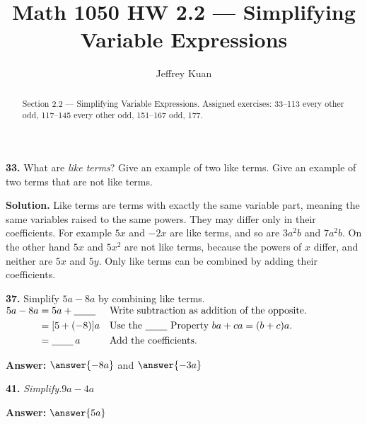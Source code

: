 \documentclass{ximera}
\author{Jeffrey Kuan}
\title{Math 1050 HW 2.2 --- Simplifying Variable Expressions}
\begin{document}
\begin{abstract}
    Section 2.2 --- Simplifying Variable Expressions.
    Assigned exercises: 33–113 every other odd, 117–145 every other odd, 151–167 odd, 177.
\end{abstract}

\maketitle

\begin{problem}
\textbf{33.} What are \emph{like terms}? Give an example of two like terms. Give an example
  of two terms that are not like terms.

\begin{hint}
\textbf{Solution.} Like terms are terms with exactly the same variable part, meaning the same variables raised to the same powers. They may differ only in their coefficients. For example $5x$ and $-2x$ are like terms, and so are $3a^{2}b$ and $7a^{2}b$. On the other hand $5x$ and $5x^{2}$ are not like terms, because the powers of $x$ differ, and neither are $5x$ and $5y$. Only like terms can be combined by adding their coefficients.
\end{hint}
\end{problem}

\begin{problem}
\textbf{37.} Simplify $5a - 8a$ by combining like terms.
  \\[2pt]
  \hspace*{1.5em}$\begin{aligned}
    5a - 8a &= 5a + \underline{\hspace{2.2em}} && \text{Write subtraction as addition of the opposite.}\\
            &= [5 + (-8)]a && \text{Use the \underline{\hspace{2.2em}} Property } ba + ca = (b + c)a.\\
            &= \underline{\hspace{2.2em}}\, a  && \text{Add the coefficients.}
  \end{aligned}$

\textbf{Answer:} $\answer{-8a}$ and $\answer{-3a}$
\end{problem}

\begin{problem}
\textbf{41.} \emph{Simplify.}\quad $9a - 4a$

\textbf{Answer:} $\answer{5a}$
\end{problem}
\end{document}
